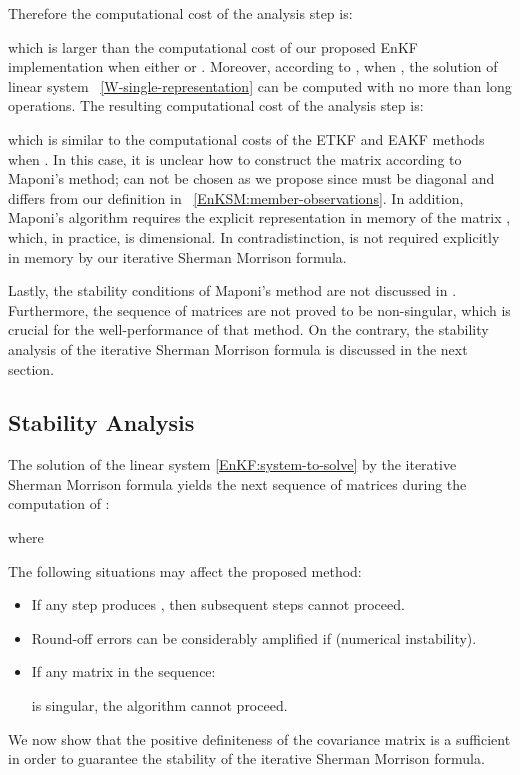 \documentclass[12pt]{article}
\begin{document}
Therefore the computational cost of the analysis step is:

which is larger than the computational cost of our proposed EnKF implementation when either  or . Moreover, according to \citep[Theorem 3]{Maponi2007276}, when , the solution of linear system ~\eqref{W-single-representation} can be computed with no more than  long operations. The resulting computational cost of the analysis step is:

which is similar to the computational costs of the ETKF and EAKF methods when . In this case, it is unclear how to construct the matrix  according to Maponi's method;  can not be chosen as we propose since  must be diagonal and  differs from our definition in ~\eqref{EnKSM:member-observations}. In addition, Maponi's algorithm requires the explicit representation in memory of the matrix , which, in practice, is  dimensional. In contradistinction,  is not required explicitly in memory by our iterative Sherman Morrison formula. 

Lastly, the stability conditions of Maponi's method are not discussed in \cite{Maponi2007276}. Furthermore, the sequence of matrices  are not proved to be non-singular, which is crucial for the well-performance of that method. On the contrary, the stability analysis of the iterative Sherman Morrison formula is discussed in the next section.

\subsection{Stability Analysis}
\label{EnKSM:stability-iterative-method}

The solution of the linear system \eqref{EnKF:system-to-solve} by the iterative Sherman Morrison formula yields the next sequence of matrices during the computation of :

where 


The following situations may affect the proposed method:
\begin{itemize}
\item If any step produces , then subsequent steps cannot proceed.
\item Round-off errors can be considerably amplified if  (numerical instability). \item If any matrix  in the sequence:

is singular, the algorithm cannot proceed. 
\end{itemize} 

We now show that the positive definiteness of the covariance matrix  is a sufficient in order to guarantee the stability of the iterative Sherman Morrison formula.
 
\end{document}
